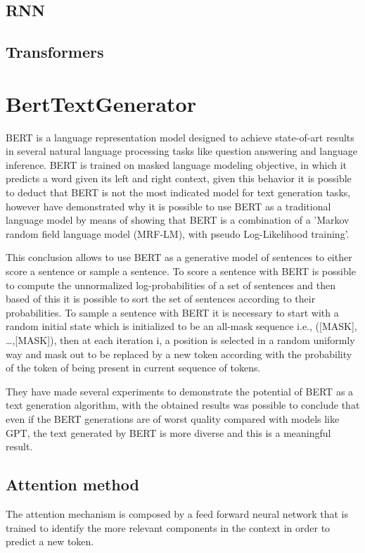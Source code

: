 \documentclass[10pt,twocolumn,letterpaper]{article}
\begin{document}
\subsection{RNN}

\subsection{Transformers}


\section{BertTextGenerator}
BERT is a language representation model designed to achieve state-of-art results
in several natural language processing tasks like question answering and language inference.
BERT is trained on masked language modeling objective, in which it predicts a word given its
left and right context, given this behavior it is possible to deduct that BERT is not the most
indicated model for text generation tasks, however \cite{wang2019bert} have demonstrated why
it is possible to use BERT as a traditional language model by means of showing that BERT is a
combination of a 'Markov random field language model (MRF-LM), with pseudo Log-Likelihood training'.

This conclusion allows to use BERT as a generative model of sentences to either score a sentence or
sample a sentence.
To score a sentence with BERT is possible to compute the unnormalized log-probabilities of a set of
sentences and then based of this it is possible to sort the set of sentences according to their probabilities.
To sample a sentence with BERT it is necessary to start with a random initial state which is initialized to be
an all-mask sequence i.e., ([MASK], …,[MASK]), then at each iteration i, a position is selected in a random uniformly
way and mask out to be replaced by a new token according with the probability of the token of being present in current
sequence of tokens.

They have made several experiments to demonstrate the potential of BERT as a text generation algorithm,
with the obtained results was possible to conclude that even if the BERT generations are of worst quality
compared with models like GPT, the text generated by BERT is more diverse and this is a meaningful result.


\subsection{Attention method}
The attention mechanism is composed by a feed forward neural network that is trained to
identify the more relevant components in the context in order to predict a new token.
\end{document}
